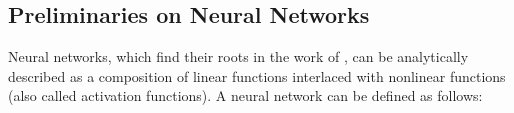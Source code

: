 \subsection{Preliminaries on Neural Networks}
\label{subsection:ch2-preliminaries_on_neural_networks}


%


Neural networks, which find their roots in the work of \citet{mcculloch1943logical,rosenblatt1958perceptron}, can be analytically described as a composition of linear functions interlaced with nonlinear functions (also called activation functions).
A neural network can be defined as follows:


